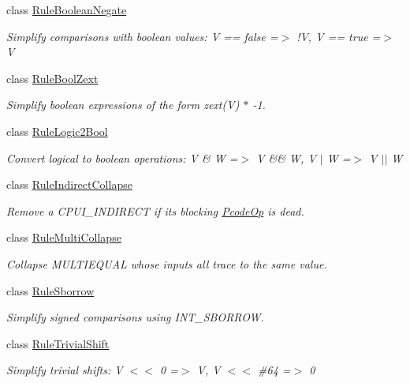 \begin{DoxyCompactItemize}
class \mbox{\hyperlink{class_rule_boolean_negate}{Rule\+Boolean\+Negate}}
\begin{DoxyCompactList}\small\item\em Simplify comparisons with boolean values\+: {\ttfamily V == false =$>$ !V, V == true =$>$ V} \end{DoxyCompactList}\item 
class \mbox{\hyperlink{class_rule_bool_zext}{Rule\+Bool\+Zext}}
\begin{DoxyCompactList}\small\item\em Simplify boolean expressions of the form zext(\+V) $\ast$ -\/1. \end{DoxyCompactList}\item 
class \mbox{\hyperlink{class_rule_logic2_bool}{Rule\+Logic2\+Bool}}
\begin{DoxyCompactList}\small\item\em Convert logical to boolean operations\+: {\ttfamily V \& W =$>$ V \&\& W, V $\vert$ W =$>$ V $\vert$$\vert$ W} \end{DoxyCompactList}\item 
class \mbox{\hyperlink{class_rule_indirect_collapse}{Rule\+Indirect\+Collapse}}
\begin{DoxyCompactList}\small\item\em Remove a C\+P\+U\+I\+\_\+\+I\+N\+D\+I\+R\+E\+CT if its blocking \mbox{\hyperlink{class_pcode_op}{Pcode\+Op}} is dead. \end{DoxyCompactList}\item 
class \mbox{\hyperlink{class_rule_multi_collapse}{Rule\+Multi\+Collapse}}
\begin{DoxyCompactList}\small\item\em Collapse M\+U\+L\+T\+I\+E\+Q\+U\+AL whose inputs all trace to the same value. \end{DoxyCompactList}\item 
class \mbox{\hyperlink{class_rule_sborrow}{Rule\+Sborrow}}
\begin{DoxyCompactList}\small\item\em Simplify signed comparisons using I\+N\+T\+\_\+\+S\+B\+O\+R\+R\+OW. \end{DoxyCompactList}\item 
class \mbox{\hyperlink{class_rule_trivial_shift}{Rule\+Trivial\+Shift}}
\begin{DoxyCompactList}\small\item\em Simplify trivial shifts\+: {\ttfamily V $<$$<$ 0 =$>$ V, V $<$$<$ \#64 =$>$ 0} \end{DoxyCompactList}\item 

\end{DoxyCompactItemize}
